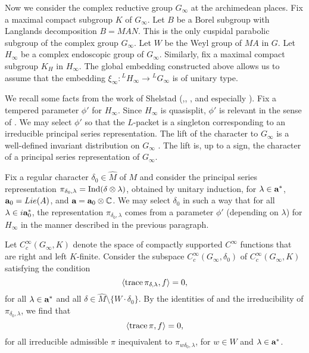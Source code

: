 Now we consider the complex reductive
group $G_\infty$ at the archimedean places.
Fix a maximal compact subgroup $K$ of $G_\infty$.  
Let $B$ be
a Borel subgroup with Langlands decomposition $B=MAN$.  This
is the only cuspidal parabolic subgroup of the complex
group $G_\infty$.
Let $W$ be the Weyl group of $MA$ in $G$. 
Let $H_\infty$ be a complex endoscopic group of $G_\infty$.  
Similarly, fix a maximal compact subgroup
$K_H$ in $H_\infty$.  The global embedding constructed above allows
us to assume
that the
embedding $\xi_\infty:{}^LH_\infty \to {}^LG_\infty$ is of unitary type.

We recall some facts from the work of Shelstad (\cite{Sh1},\cite{Sh2},
\cite{Sh4}, and especially \cite{Sh3}).
Fix a tempered parameter $\phi'$ for $H_\infty$.
Since $H_\infty$ is quasisplit, $\phi'$
is relevant in the sense of \cite{B}.
We may select $\phi'$ so that the $L$-packet is a
singleton corresponding to an irreducible principal series
representation.  The lift of the character to $G_\infty$ is a well-defined
invariant distribution on $G_\infty$ 
\cite{Sh3,4.0.1}.  The lift is,
up to a sign, the character of a principal series representation
of $G_\infty$.

Fix a regular character $\delta_0\in \hat M$ of $M$ and consider the
principal series representation $\pi_{\delta_0,\lambda}
	=\Ind(\delta\otimes\lambda)$, obtained by
unitary induction, for $\lambda\in\aa^*$,
$\aa_0=Lie(A)$, 
and $\aa = \aa_0\otimes {\Bbb C}$. 
We may select $\delta_0$ in such a way that
for all $\lambda\in i\aa_0^*$, the representation $\pi_{\delta_0,\lambda}$
comes from a parameter $\phi'$ (depending on $\lambda$) for
$H_\infty$ in the manner described in the previous paragraph.

Let $C_c^\infty(G_\infty,K)$ denote the space of compactly
supported $C^\infty$ functions that are right and left $K$-finite.
Consider the subspace $C_c^\infty(G_\infty,\delta_0)$ of 
$C_c^\infty(G_\infty,K)$
satisfying the condition
$$\langle \tr \pi_{\delta,\lambda},f\rangle = 0,$$
for all $\lambda\in \aa^*$ and all 
$\delta\in \hat M\setminus \{W\cdot \delta_0\}$.  By the identities
of \cite{Vo,6.6.7} and the irreducibility of $\pi_{\delta_0,\lambda}$,
we find that
$$\langle \tr \pi,f\rangle = 0,$$
for all irreducible admissible $\pi$ inequivalent
to $\pi_{w\delta_0,\lambda}$,
for $w\in W$ and $\lambda\in \aa^*$.  

